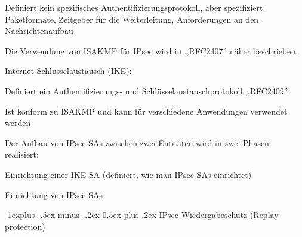 \documentclass[a4paper]{article}
\makeatletter
\renewcommand{\subsection}{\@startsection{subsection}{2}{0mm}%
 {-1explus -.5ex minus -.2ex}%
 {0.5ex plus .2ex}%
 {\normalfont\normalsize\bfseries}}
\makeatother
\begin{document}
\begin{multicols}{3}
\begin{itemize*}
\begin{itemize*}
\begin{itemize*}
                        \item Definiert kein spezifisches Authentifizierungsprotokoll, aber spezifiziert: Paketformate, Zeitgeber für die Weiterleitung, Anforderungen an den Nachrichtenaufbau
                        \item Die Verwendung von ISAKMP für IPsec wird in ,,RFC2407'' näher beschrieben.
                  \end{itemize*}
                  \item Internet-Schlüsselaustausch (IKE):
                  \begin{itemize*}
                        \item Definiert ein Authentifizierungs- und Schlüsselaustauschprotokoll ,,RFC2409''.
                        \item Ist konform zu ISAKMP und kann für verschiedene Anwendungen verwendet werden
                        \item Der Aufbau von IPsec SAs zwischen zwei Entitäten wird in zwei Phasen realisiert:
                        \item Einrichtung einer IKE SA (definiert, wie man IPsec SAs einrichtet)
                        \item Einrichtung von IPsec SAs
                  \end{itemize*}
            \end{itemize*}
      \end{itemize*}


      \subsection{IPsec-Wiedergabeschutz (Replay
            protection)}


\end{multicols}
\end{document}
